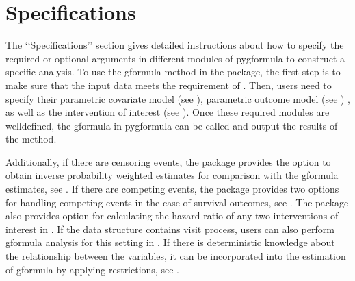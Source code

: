 \documentclass[letterpaper,10pt,english]{sphinxmanual}
\begin{document}
\chapter{Specifications}
\label{\detokenize{Specifications/index:specifications}}\label{\detokenize{Specifications/index::doc}}
\sphinxAtStartPar
The ‘‘Specifications’’ section gives detailed instructions about how to specify the required or optional
arguments in different modules of pygformula to construct a specific analysis. To use the g\sphinxhyphen{}formula method in the package,
the first step is to make sure that the input data meets the requirement of
{\hyperref[\detokenize{Specifications/Input data::doc}]{}}.
Then, users need to specify their parametric covariate model (see {\hyperref[\detokenize{Specifications/Covariate models::doc}]{}}),
parametric outcome model (see {\hyperref[\detokenize{Specifications/Outcome model::doc}]{}})
, as well as the intervention of interest (see {\hyperref[\detokenize{Specifications/Interventions::doc}]{}}).
Once these required modules are well\sphinxhyphen{}defined, the g\sphinxhyphen{}formula in pygformula can be called and output the results of the method.

\sphinxAtStartPar
Additionally, if there are censoring events, the package provides the option to obtain inverse probability weighted estimates
for comparison with the g\sphinxhyphen{}formula estimates,
see {\hyperref[\detokenize{Specifications/Censoring event::doc}]{}}.
If there are competing events, the package provides two options for handling competing events in the case of survival outcomes, see
{\hyperref[\detokenize{Specifications/Competing event::doc}]{}}.
The package also provides option for calculating the hazard ratio of any two interventions of interest in
{\hyperref[\detokenize{Specifications/Hazard ratio::doc}]{}}.
If the data structure contains visit process, users can also perform g\sphinxhyphen{}formula analysis for this setting in
{\hyperref[\detokenize{Specifications/Visit process::doc}]{}}.
If there is deterministic knowledge about the relationship between the variables, it can be incorporated into the estimation
of g\sphinxhyphen{}formula by applying restrictions, see {\hyperref[\detokenize{Specifications/Deterministic knowledge::doc}]{}}.
\end{document}
